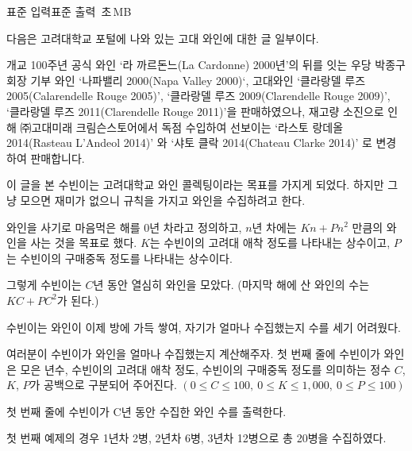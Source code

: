 \begin{problem}{\kcpcwinetitle}
    {표준 입력}{표준 출력}
    {\kcpcwinetime\,초}{\kcpcwinememory\,MB}{}{\kcpcwinescore}
    
    다음은 고려대학교 포털에 나와 있는 고대 와인에 대한 글 일부이다.
    
    \begin{framed}
        개교 100주년 공식 와인 `라 까르돈느(La Cardonne) 2000년’의 뒤를 잇는 우당 박종구 회장 기부 와인 `나파밸리 2000(Napa Valley 2000)‘, 고대와인 `클라랑델 루즈 2005(Calarendelle Rouge 2005)’, `클라랑델 루즈 2009(Clarendelle Rouge 2009)', `클라랑델 루즈 2011(Clarendelle Rouge 2011)'을 판매하였으나, 재고량 소진으로 인해 ㈜고대미래 크림슨스토어에서 독점 수입하여 선보이는 `라스토 랑데올 2014(Rasteau L’Andeol 2014)’ 와 ‘샤토 클락 2014(Chateau Clarke 2014)’ 로 변경하여 판매합니다.   
    \end{framed}
    
    이 글을 본 수빈이는 고려대학교 와인 콜렉팅이라는 목표를 가지게 되었다. 하지만 그냥 모으면 재미가 없으니 규칙을 가지고 와인을 수집하려고 한다.
    
    와인을 사기로 마음먹은 해를 0년 차라고 정의하고, $ n $년 차에는 $ Kn+Pn^2 $ 만큼의 와인을 사는 것을 목표로 했다. $ K $는 수빈이의 고려대 애착 정도를 나타내는 상수이고, $ P $는 수빈이의 구매중독 정도를 나타내는 상수이다. 
    
    그렇게 수빈이는 $ C $년 동안 열심히 와인을 모았다. (마지막 해에 산 와인의 수는 $ KC + PC^2 $가 된다.)
    
    수빈이는 와인이 이제 방에 가득 쌓여, 자기가 얼마나 수집했는지 수를 세기 어려웠다.
    
    여러분이 수빈이가 와인을 얼마나 수집했는지 계산해주자.
    \InputFile
    첫 번째 줄에 수빈이가 와인은 모은 년수, 수빈이의 고려대 애착 정도, 수빈이의 구매중독 정도를 의미하는 정수 $ C $, $ K $, $ P $가 공백으로 구분되어 주어진다. $ (0 \leq C \leq 100,\ 0 \leq K \leq 1,000,\ 0 \leq P \leq 100) $
    
    \OutputFile
    첫 번째 줄에 수빈이가 C년 동안 수집한 와인 수를 출력한다.
    
    \Examples
    
    \begin{example}
    \end{example}
    
    \Explanation
    첫 번째 예제의 경우 1년차 2병, 2년차 6병, 3년차 12병으로 총 20병을 수집하였다.
\end{problem}

